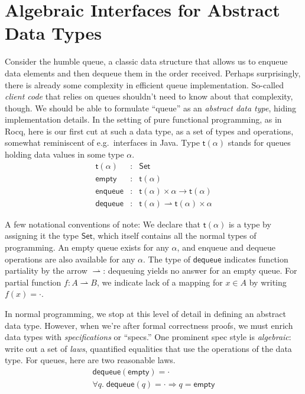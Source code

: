 \documentclass{amsbook}
\theoremstyle{definition}
\theoremstyle{remark}
\numberwithin{section}{chapter}
\numberwithin{equation}{chapter}
\begin{document}
\section{Algebraic Interfaces for Abstract Data Types}

\newcommand{\mt}[1]{\mathsf{#1}}

Consider the humble queue, a classic data structure that allows us to enqueue data elements and then dequeue them in the order received.
Perhaps surprisingly, there is already some complexity in efficient queue implementation.
So-called \emph{client code} that relies on queues shouldn't need to know about that complexity, though.
We should be able to formulate ``queue'' as an \emph{abstract data type}, hiding implementation details.
In the setting of pure functional programming, as in Rocq, here is our first cut at such a data type, as a set of types and operations, somewhat reminiscent of e.g.\ interfaces in Java.
Type $\mt{t}(\alpha)$ stands for queues holding data values in some type $\alpha$.
\begin{eqnarray*}
  \mt{t}(\alpha) &:& \mt{Set} \\
  \mt{empty} &:& \mt{t}(\alpha) \\
  \mt{enqueue} &:& \mt{t}(\alpha) \times \alpha \to \mt{t}(\alpha) \\
  \mt{dequeue} &:& \mt{t}(\alpha) \rightharpoonup \mt{t}(\alpha) \times \alpha
\end{eqnarray*}

A few notational conventions of note:
We declare that $\mt{t}(\alpha)$ is a type by assigning it the type $\mt{Set}$, which itself contains all the normal types of programming.
An empty queue exists for any $\alpha$, and enqueue and dequeue operations are also available for any $\alpha$.
The type of $\mt{dequeue}$ indicates function partiality by the arrow $\rightharpoonup$: dequeuing yields no answer for an empty queue.
For partial function $f : A \rightharpoonup B$, we indicate lack of a mapping for $x \in A$ by writing $f(x) = \cdot$.

In normal programming, we stop at this level of detail in defining an abstract data type.
However, when we're after formal correctness proofs, we must enrich data types with \emph{specifications} or ``specs.''  
One prominent spec style is \emph{algebraic}: write out a set of \emph{laws}, quantified equalities that use the operations of the data type.
For queues, here are two reasonable laws.
$$\begin{array}{l}
  \mt{dequeue}(\mt{empty}) = \cdot \\
  \forall q. \; \mt{dequeue}(q) = \cdot \Rightarrow q = \mt{empty} \\
\end{array}$$
\end{document}
